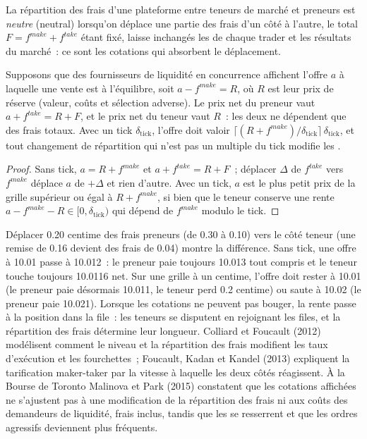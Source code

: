 \begin{definition}\label{def:mx:fees-rebates-and-venue-economics:neutral}
La répartition des frais d'une plateforme entre teneurs de marché et preneurs est \emph{neutre} (neutral) lorsqu'on déplace une partie des frais d'un côté à l'autre,
le total $F=f^{make}+f^{take}$ étant fixé, laisse inchangés les  de chaque trader et les résultats du marché~: ce sont les cotations qui absorbent le déplacement.
\end{definition}

\begin{proposition}\label{prop:mx:fees-rebates-and-venue-economics:neutral}
Supposons que des fournisseurs de liquidité en concurrence affichent l'offre $a$ à laquelle une vente est à l'équilibre, soit $a-f^{make}=R$, où $R$ est leur prix de réserve (valeur, coûts
et sélection adverse). Le prix net du preneur vaut $a+f^{take}=R+F$, et le prix net du teneur vaut $R$~: les deux ne dépendent que des frais totaux. Avec un
tick $\delta_{\mathrm{tick}}$, l'offre doit valoir $\lceil(R+f^{make})/\delta_{\mathrm{tick}}\rceil\,\delta_{\mathrm{tick}}$, et tout changement de répartition
qui n'est pas un multiple du tick modifie les .
\end{proposition}

\begin{proof}
Sans tick, $a=R+f^{make}$ et $a+f^{take}=R+F$~; déplacer $\Delta$ de $f^{take}$ vers $f^{make}$ déplace $a$ de $+\Delta$ et rien d'autre. Avec un
tick, $a$ est le plus petit prix de la grille supérieur ou égal à $R+f^{make}$, si bien que le teneur conserve une rente $a-f^{make}-R\in[0,\delta_{\mathrm{tick}})$ qui dépend
de $f^{make}$ modulo le tick.
\end{proof}

Déplacer 0.20 centime des frais preneurs (de 0.30 à 0.10) vers le côté teneur (une remise de 0.16 devient des frais de 0.04) montre la différence. Sans tick, une offre à
10.01 passe à 10.012~: le preneur paie toujours 10.013 tout compris et le teneur touche toujours 10.0116 net. Sur une grille à un centime, l'offre doit rester à 10.01 (le preneur paie désormais
10.011, le teneur perd 0.2 centime) ou saute à 10.02 (le preneur paie 10.021). Lorsque les cotations ne peuvent pas bouger, la rente passe à la position dans la file~:
les teneurs se disputent en rejoignant les files, et la répartition des frais détermine leur longueur. Colliard et Foucault (2012) modélisent comment le niveau et la répartition des frais
modifient les taux d'exécution et les fourchettes~; Foucault, Kadan et Kandel (2013) expliquent la tarification maker-taker par la vitesse à laquelle les deux côtés réagissent. À la Bourse de Toronto
Malinova et Park (2015) constatent que les cotations affichées ne s'ajustent pas à une modification de la répartition des frais ni aux coûts des demandeurs de liquidité, frais inclus,
tandis que les  se resserrent et que les ordres agressifs deviennent plus fréquents.

